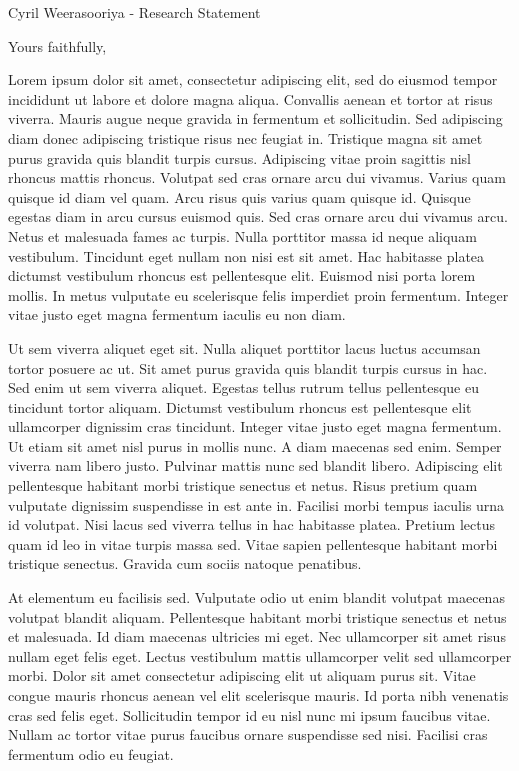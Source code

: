 \date{\today}
\opening{Cyril Weerasooriya - Research Statement}
\closing{Yours faithfully,}

Lorem ipsum dolor sit amet, consectetur adipiscing elit, sed do eiusmod tempor incididunt ut labore et dolore magna aliqua. Convallis aenean et tortor at risus viverra. Mauris augue neque gravida in fermentum et sollicitudin. Sed adipiscing diam donec adipiscing tristique risus nec feugiat in. Tristique magna sit amet purus gravida quis blandit turpis cursus. Adipiscing vitae proin sagittis nisl rhoncus mattis rhoncus. Volutpat sed cras ornare arcu dui vivamus. Varius quam quisque id diam vel quam. Arcu risus quis varius quam quisque id. Quisque egestas diam in arcu cursus euismod quis. Sed cras ornare arcu dui vivamus arcu. Netus et malesuada fames ac turpis. Nulla porttitor massa id neque aliquam vestibulum. Tincidunt eget nullam non nisi est sit amet. Hac habitasse platea dictumst vestibulum rhoncus est pellentesque elit. Euismod nisi porta lorem mollis. In metus vulputate eu scelerisque felis imperdiet proin fermentum. Integer vitae justo eget magna fermentum iaculis eu non diam.

Ut sem viverra aliquet eget sit. Nulla aliquet porttitor lacus luctus accumsan tortor posuere ac ut. Sit amet purus gravida quis blandit turpis cursus in hac. Sed enim ut sem viverra aliquet. Egestas tellus rutrum tellus pellentesque eu tincidunt tortor aliquam. Dictumst vestibulum rhoncus est pellentesque elit ullamcorper dignissim cras tincidunt. Integer vitae justo eget magna fermentum. Ut etiam sit amet nisl purus in mollis nunc. A diam maecenas sed enim. Semper viverra nam libero justo. Pulvinar mattis nunc sed blandit libero. Adipiscing elit pellentesque habitant morbi tristique senectus et netus. Risus pretium quam vulputate dignissim suspendisse in est ante in. Facilisi morbi tempus iaculis urna id volutpat. Nisi lacus sed viverra tellus in hac habitasse platea. Pretium lectus quam id leo in vitae turpis massa sed. Vitae sapien pellentesque habitant morbi tristique senectus. Gravida cum sociis natoque penatibus.

At elementum eu facilisis sed. Vulputate odio ut enim blandit volutpat maecenas volutpat blandit aliquam. Pellentesque habitant morbi tristique senectus et netus et malesuada. Id diam maecenas ultricies mi eget. Nec ullamcorper sit amet risus nullam eget felis eget. Lectus vestibulum mattis ullamcorper velit sed ullamcorper morbi. Dolor sit amet consectetur adipiscing elit ut aliquam purus sit. Vitae congue mauris rhoncus aenean vel elit scelerisque mauris. Id porta nibh venenatis cras sed felis eget. Sollicitudin tempor id eu nisl nunc mi ipsum faucibus vitae. Nullam ac tortor vitae purus faucibus ornare suspendisse sed nisi. Facilisi cras fermentum odio eu feugiat.


